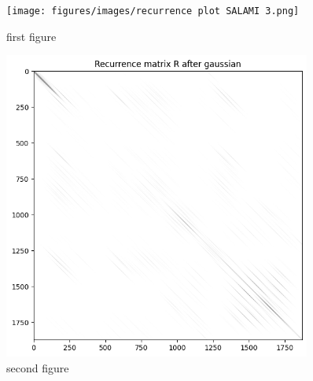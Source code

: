 
\begin{figure}[ht]
    \centering
    \begin{minipage}{0.45\textwidth}
        \centering
        \texttt{[image: figures/images/recurrence plot SALAMI 3.png]} %
        \caption{first figure}
    \end{minipage}\hfill
    \begin{minipage}{0.45\textwidth}
        \centering
        \includegraphics[width=0.9\textwidth]{figures/images/Rec_matrix_smooth_SALAMI_track_2.png} %
        \caption{second figure}
    \end{minipage}
\end{figure}

